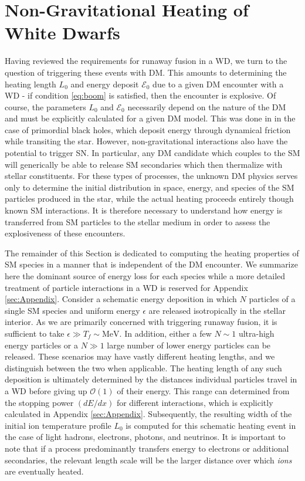 \documentclass[twocolumn,showpacs,preprintnumbers,amsmath,amssymb,prd]{revtex4}
\newcommand{\Ez}{\mathcal{E}_0}
\newcommand{\OO}{\mathcal{O}}
\begin{document}
\section{Non-Gravitational Heating of White Dwarfs}
\label{sec:SMHeating}

Having reviewed the requirements for runaway fusion in a WD, we turn to the question of triggering these events with DM. 
This amounts to determining the heating length $L_0$ and energy deposit $\Ez$ due to a given DM encounter with a WD - if condition \eqref{eq:boom} is satisfied, then the encounter is explosive.
Of course, the parameters $L_0$ and $\Ez$ necessarily depend on the nature of the DM and must be explicitly calculated for a given DM model. 
This was done in \cite{Graham:2015apa} in the case of primordial black holes, which deposit energy through dynamical friction while transiting the star.
However, non-gravitational interactions also have the potential to trigger SN. 
In particular, any DM candidate which couples to the SM will generically be able to release SM secondaries which then thermalize with stellar constituents. 
For these types of processes, the unknown DM physics serves only to determine the initial distribution in space, energy, and species of the SM particles produced in the star, while the actual heating proceeds entirely though known SM interactions. 
It is therefore necessary to understand how energy is transferred from SM particles to the stellar medium in order to assess the explosiveness of these encounters.

The remainder of this Section is dedicated to computing the heating properties of SM species in a manner that is independent of the DM encounter. 
We summarize here the dominant source of energy loss for each species while a more detailed treatment of particle interactions in a WD is reserved for Appendix \ref{sec:Appendix}. 
Consider a schematic energy deposition in which $N$ particles of a single SM species and uniform energy $\epsilon$ are released isotropically in the stellar interior.
As we are primarily concerned with triggering runaway fusion, it is sufficient to take $\epsilon \gg T_f \sim \text{MeV}$.
In addition, either a few $N \sim 1$ ultra-high energy particles or a $N \gg 1$ large number of lower energy particles can be released. 
These scenarios may have vastly different heating lengths, and we distinguish between the two when applicable. 
The heating length of any such deposition is ultimately determined by the distances individual particles travel in a WD before giving up $\OO(1)$ of their energy.
This range can determined from the stopping power $(dE/dx)$ for different interactions, which is explicitly calculated in Appendix \ref{sec:Appendix}. 
Subsequently, the resulting width of the initial ion temperature profile $L_0$ is computed for this schematic heating event in the case of light hadrons, electrons, photons, and neutrinos.
It is important to note that if a process predominantly transfers energy to electrons or additional secondaries, the relevant length scale will be the larger distance over which \emph{ions} are eventually heated. 
\end{document}
